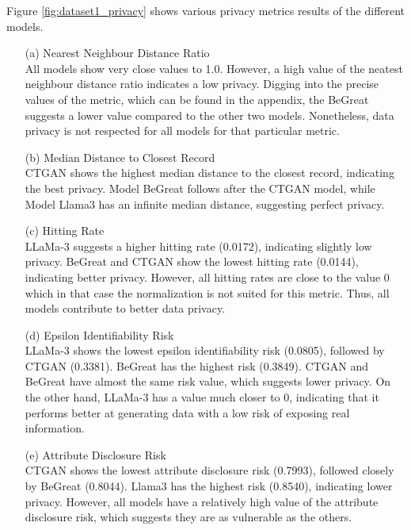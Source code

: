 Figure \ref{fig:dataset1_privacy} shows various privacy metrics results of the different models.

\begin{enumerate}
    \item[(a)] Nearest Neighbour Distance Ratio \\
    All models show very close values to 1.0. However, a high value of the neatest neighbour distance ratio indicates a low privacy. Digging into the precise values of the metric, which can be found in the appendix, the BeGreat suggests a lower value compared to the other two models. Nonetheless, data privacy is not respected for all models for that particular metric.

    \item[(b)] Median Distance to Closest Record \\
    CTGAN shows the highest median distance to the closest record, indicating the best privacy. Model BeGreat follows after the CTGAN model, while Model Llama3 has an infinite median distance, suggesting perfect privacy. %

    
    \item[(c)] Hitting Rate \\
    LLaMa-3 suggests a higher hitting rate (0.0172), indicating slightly low privacy. BeGreat and CTGAN show the lowest hitting rate (0.0144), indicating better privacy. However, all hitting rates are close to the value 0 which in that case the normalization is not suited for this metric. Thus, all models contribute to better data privacy.


    \item[(d)] Epsilon Identifiability Risk \\
    LLaMa-3 shows the lowest epsilon identifiability risk (0.0805), followed by CTGAN (0.3381). BeGreat has the highest risk (0.3849). CTGAN and BeGreat have almost the same risk value, which suggests lower privacy. On the other hand, LLaMa-3 has a value much closer to 0, indicating that it performs better at generating data with a low risk of exposing real information. 

    \item[(e)] Attribute Disclosure Risk \\
    CTGAN shows the lowest attribute disclosure risk (0.7993), followed closely by BeGreat (0.8044). Llama3 has the highest risk (0.8540), indicating lower privacy. However, all models have a relatively high value of the attribute disclosure risk, which suggests they are as vulnerable as the others. %
    
\end{enumerate}




